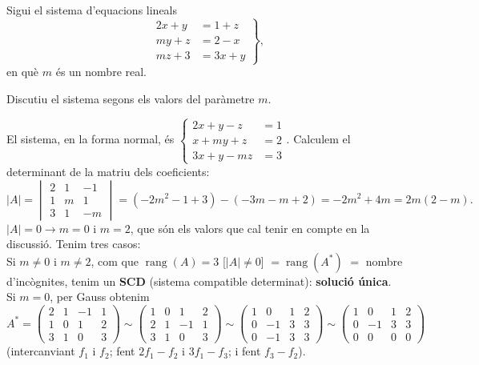 Sigui el sistema d'equacions lineals
\[
\left.\begin{aligned}
2x+y&=1+z\\
my+z&=2-x\\
mz+3&=3x+y
\end{aligned}\right\},
\]
en què $m$ és un nombre real.

\begin{apartats}

Discutiu el sistema segons els valors del paràmetre $m$.

\begin{solucio}
El sistema, en la forma normal, és
$\left\{\begin{aligned}2x+y-z&=1\\x+my+z&=2\\3x+y-mz&=3\end{aligned}\right.$.
Calculem el determinant de la matriu dels coeficients:
\[
|A|=\begin{vmatrix}2&1&-1\\1&m&1\\3&1&-m\end{vmatrix}=\left(-2m^2-1+3\right)-(-3m-m+2)=-2m^2+4m=2m(2-m).
\]
$|A|=0\rightarrow m=0$ i $m=2$, que són els valors que cal tenir en compte en la discussió. Tenim tres casos:\\
Si $m\neq0$ i $m\neq2$, com que $\operatorname{rang}(A)=3$ [$|A|\neq0$] $=\operatorname{rang}(A^*)$ $=$ nombre
d'incògnites, tenim un \textbf{SCD} (sistema compatible determinat): \textbf{solució única}.\\
Si $m=0$, per Gauss obtenim
\[
A^*=\left(\begin{array}{ccc|c}2&1&-1&1\\1&0&1&2\\3&1&0&3\end{array}\right)
\sim\left(\begin{array}{ccc|c}1&0&1&2\\2&1&-1&1\\3&1&0&3\end{array}\right)
\sim\left(\begin{array}{ccc|c}1&0&1&2\\0&-1&3&3\\0&-1&3&3\end{array}\right)
\sim\left(\begin{array}{ccc|c}1&0&1&2\\0&-1&3&3\\0&0&0&0\end{array}\right)
\]
(intercanviant $f_1$ i $f_2$; fent $2f_1-f_2$ i $3f_1-f_3$; i fent $f_3-f_2$).

\end{solucio}
\end{apartats}
